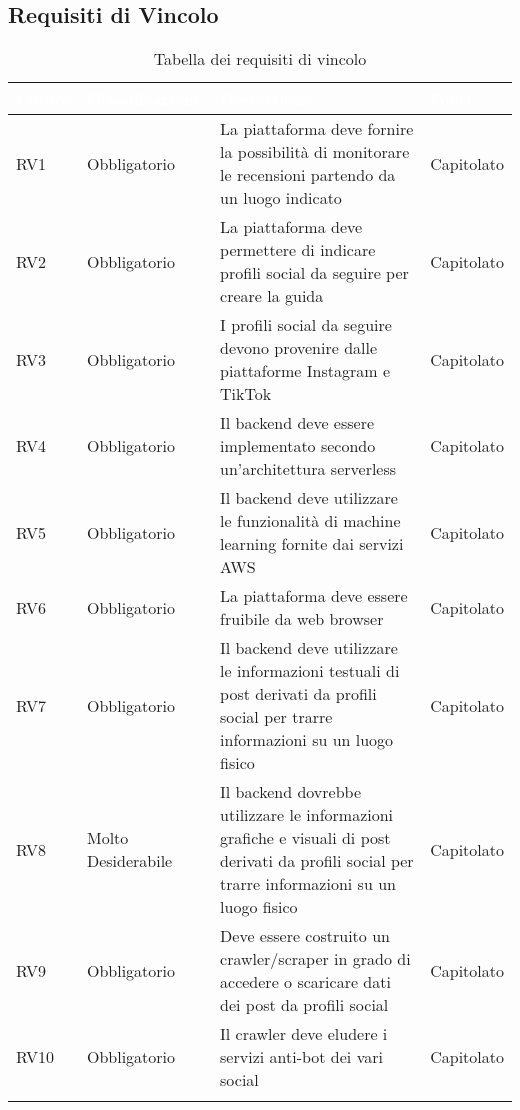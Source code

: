 \subsection{Requisiti di Vincolo}
{
      \setlength{\freewidth}{\dimexpr\textwidth-10\tabcolsep}
      \renewcommand{\arraystretch}{1.5}
      \centering
      \setlength{\aboverulesep}{0pt}
      \setlength{\belowrulesep}{0pt}
      \begin{longtable}{C{.257\freewidth} C{.257\freewidth} C{.257\freewidth} C{.257\freewidth}}
         \toprule
      \textcolor{white}{\textbf{Codice}}&
      \textcolor{white}{\textbf{Classificazione}}&
      \textcolor{white}{\textbf{Descrizione}}&
      \textcolor{white}{\textbf{Fonti}}\\	
      \toprule
      \endhead
      
      RV1 & Obbligatorio & La piattaforma deve fornire la possibilità di monitorare le recensioni partendo da un luogo indicato & Capitolato \\
      RV2 & Obbligatorio & La piattaforma deve permettere di indicare profili social da seguire per creare la guida & Capitolato \\
      RV3 & Obbligatorio & I profili social da seguire devono provenire dalle piattaforme Instagram e TikTok & Capitolato \\
      RV4 & Obbligatorio & Il backend deve essere implementato secondo un'architettura serverless & Capitolato \\
      RV5 & Obbligatorio & Il backend deve utilizzare le funzionalità di machine learning fornite dai servizi AWS & Capitolato \\
      RV6 & Obbligatorio & La piattaforma deve essere fruibile da web browser & Capitolato \\
      RV7 & Obbligatorio & Il backend deve utilizzare le informazioni testuali di post derivati da profili social per trarre informazioni su un luogo fisico & Capitolato \\
      RV8 & Molto Desiderabile & Il backend dovrebbe utilizzare le informazioni grafiche e visuali di post derivati da profili social per trarre informazioni su un luogo fisico & Capitolato \\
      RV9 & Obbligatorio & Deve essere costruito un crawler/scraper in grado di accedere o scaricare dati dei post da profili social & Capitolato \\
      RV10 & Obbligatorio & Il crawler deve eludere i servizi anti-bot dei vari social & Capitolato \\
      \bottomrule
      \caption{Tabella dei requisiti di vincolo}
      \end{longtable}
}
